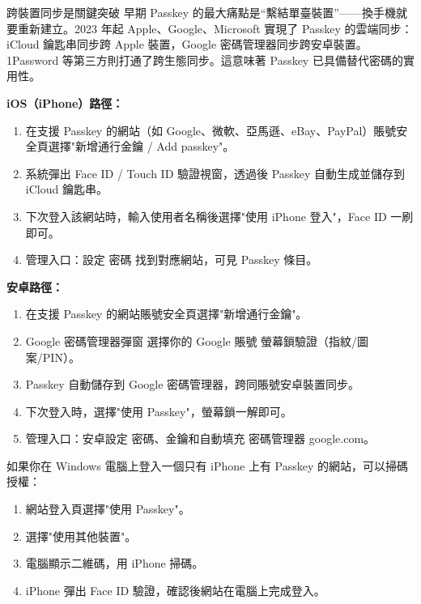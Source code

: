 \begin{tcbinfo}{跨裝置同步是關鍵突破}
早期 Passkey 的最大痛點是“繫結單臺裝置”——換手機就要重新建立。2023 年起 Apple、Google、Microsoft 實現了 Passkey 的雲端同步：iCloud 鑰匙串同步跨 Apple 裝置，Google 密碼管理器同步跨安卓裝置。1Password 等第三方則打通了跨生態同步。這意味著 Passkey 已具備替代密碼的實用性。

\end{tcbinfo}


\textbf{iOS（iPhone）路徑：}

\begin{enumerate}
  \item 在支援 Passkey 的網站（如 Google、微軟、亞馬遜、eBay、PayPal）賬號安全頁選擇"新增通行金鑰 / Add passkey"。
  \item 系統彈出 Face ID / Touch ID 驗證視窗，透過後 Passkey 自動生成並儲存到 iCloud 鑰匙串。
  \item 下次登入該網站時，輸入使用者名稱後選擇"使用 iPhone 登入"，Face ID 一刷即可。
  \item 管理入口：設定 密碼 找到對應網站，可見 Passkey 條目。
\end{enumerate}

\textbf{安卓路徑：}

\begin{enumerate}
  \item 在支援 Passkey 的網站賬號安全頁選擇"新增通行金鑰"。
  \item Google 密碼管理器彈窗 選擇你的 Google 賬號 螢幕鎖驗證（指紋/圖案/PIN）。
  \item Passkey 自動儲存到 Google 密碼管理器，跨同賬號安卓裝置同步。
  \item 下次登入時，選擇"使用 Passkey"，螢幕鎖一解即可。
  \item 管理入口：安卓設定 密碼、金鑰和自動填充 密碼管理器 google.com。
\end{enumerate}


如果你在 Windows 電腦上登入一個只有 iPhone 上有 Passkey 的網站，可以掃碼授權：

\begin{enumerate}
  \item 網站登入頁選擇"使用 Passkey"。
  \item 選擇"使用其他裝置"。
  \item 電腦顯示二維碼，用 iPhone 掃碼。
  \item iPhone 彈出 Face ID 驗證，確認後網站在電腦上完成登入。
\end{enumerate}

